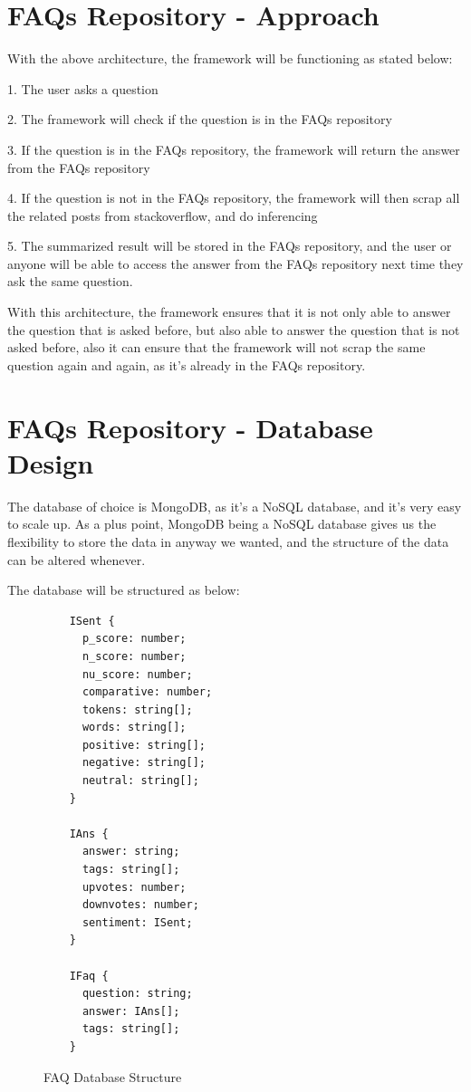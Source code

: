 \section{FAQs Repository - Approach}
With the above architecture, the framework will be functioning as stated below:

1. The user asks a question

2. The framework will check if the question is in the FAQs repository

3. If the question is in the FAQs repository, the framework will return the answer from the FAQs repository

4. If the question is not in the FAQs repository, the framework will then scrap all the related posts from stackoverflow, and do inferencing

5. The summarized result will be stored in the FAQs repository, and the user or anyone will be able to access the answer from the FAQs repository next time they ask the same question.

With this architecture, the framework ensures that it is not only able to answer the question that is asked before, but also able to answer the question that is not asked before, also it can ensure that the framework will not scrap the same question again and again, as it's already in the FAQs repository.

\section{FAQs Repository - Database Design}
The database of choice is MongoDB, as it's a NoSQL database, and it's very easy to scale up. As a plus point, MongoDB being a NoSQL database gives us the flexibility to store the data in anyway we wanted, and the structure of the data can be altered whenever. 

The database will be structured as below:

\begin{figure}[H]
  \begin{lstlisting}
    ISent {
      p_score: number;
      n_score: number;
      nu_score: number;
      comparative: number;
      tokens: string[];
      words: string[];
      positive: string[];
      negative: string[]; 
      neutral: string[];
    }
    
    IAns {
      answer: string;
      tags: string[];
      upvotes: number;
      downvotes: number;
      sentiment: ISent;
    }
    
    IFaq {
      question: string;
      answer: IAns[];
      tags: string[];
    }
    \end{lstlisting}
  \caption{FAQ Database Structure}
  \label{faq_db_structure}
\end{figure}


